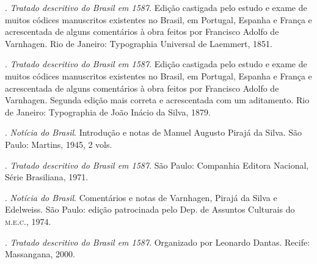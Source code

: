 \begin{bibliohedra}
\titidem. \textit{Tratado descritivo do Brasil em 1587}. Edição castigada pelo estudo e exame de muitos códices 
manuscritos existentes no Brasil, em Portugal, Espanha e França e acrescentada de alguns comentários 
à obra feitos por Francisco Adolfo de Varnhagen. Rio de Janeiro: Typographia Universal de Laemmert, 1851.

\titidem. \textit{Tratado descritivo do Brasil em 1587}. Edição castigada pelo estudo e exame de muitos códices 
manuscritos existentes no Brasil, em Portugal, Espanha e França e acrescentada de alguns comentários 
à obra feitos por Francisco Adolfo de Varnhagen. Segunda edição mais correta e acrescentada com um 
aditamento. Rio de Janeiro: Typographia de João Inácio da Silva, 1879.

\titidem. \textit{Notícia do Brasil}. Introdução e notas de Manuel Augusto Pirajá da Silva. 
São Paulo: Martins, 1945, 2 vols.

\titidem. \textit{Tratado descritivo do Brasil em 1587}. São Paulo: Companhia Editora Nacional, Série Brasiliana, 1971.

\titidem. \textit{Notícia do Brasil}. Comentários e notas de Varnhagen, Pirajá da Silva e Edelweiss. 
São Paulo: edição patrocinada pelo Dep. de Assuntos Culturais do \textsc{m.e.c.}, 1974.

\titidem. \textit{Tratado descritivo do Brasil em 1587}. Organizado por Leonardo Dantas. Recife: Massangana, 2000.

\end{bibliohedra}

